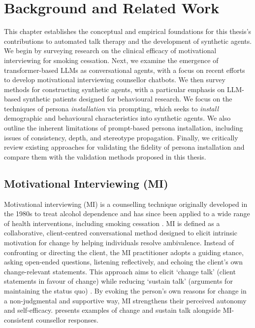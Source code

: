 \chapter{Background and Related Work}
\label{ch:background}
This chapter establishes the conceptual and empirical foundations for this thesis's contributions to automated talk therapy and the development of synthetic agents. We begin by surveying research on the clinical efficacy of motivational interviewing for smoking cessation. Next, we examine the emergence of transformer-based LLMs as conversational agents, with a focus on recent efforts to develop motivational interviewing counsellor chatbots. We then survey methods for constructing synthetic agents, with a particular emphasis on LLM-based synthetic patients designed for behavioural research. We focus on the techniques of persona \emph{installation} via prompting, which seeks to \emph{install} demographic and behavioural characteristics into synthetic agents. We also outline the inherent limitations of prompt-based persona installation, including issues of consistency, depth, and stereotype propagation. Finally, we critically review existing approaches for validating the fidelity of persona installation and compare them with the validation methods proposed in this thesis.


\section{Motivational Interviewing (MI)}
Motivational interviewing (MI) is a counselling technique originally developed in the 1980s to treat alcohol dependence and has since been applied to a wide range of health interventions, including smoking cessation \cite{Miller1983, MillerRollnick2023}. MI is defined as a collaborative, client-centred conversational method designed to elicit intrinsic motivation for change by helping individuals resolve ambivalence. Instead of confronting or directing the client, the MI practitioner adopts a guiding stance, asking open-ended questions, listening reflectively, and echoing the client's own change-relevant statements. This approach aims to elicit ‘change talk’ (client statements in favour of change) while reducing ‘sustain talk’ (arguments for maintaining the status quo) \cite{MillerRose2009}. By evoking the person's own reasons for change in a non-judgmental and supportive way, MI strengthens their perceived autonomy and self-efficacy.  presents examples of change and sustain talk alongside MI-consistent counsellor responses.


